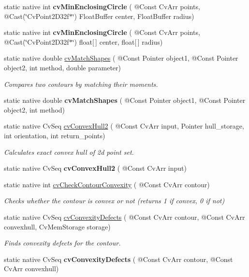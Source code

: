 \begin{DoxyCompactItemize}
static native int {\bfseries cv\+Min\+Enclosing\+Circle} ( @Const Cv\+Arr points, @Cast(\char`\"{}Cv\+Point2\+D32f$\ast$\char`\"{}) Float\+Buffer center, Float\+Buffer radius)
\item 
static native int {\bfseries cv\+Min\+Enclosing\+Circle} ( @Const Cv\+Arr points, @Cast(\char`\"{}Cv\+Point2\+D32f$\ast$\char`\"{}) float\mbox{[}$\,$\mbox{]} center, float\mbox{[}$\,$\mbox{]} radius)
\item 
static native double \hyperlink{group__imgproc__c_gab9210add45c3838c6939630bb55fa97f}{cv\+Match\+Shapes} ( @Const Pointer object1, @Const Pointer object2, int method, double parameter)
\begin{DoxyCompactList}\small\item\em Compares two contours by matching their moments. \end{DoxyCompactList}\item 
static native double {\bfseries cv\+Match\+Shapes} ( @Const Pointer object1, @Const Pointer object2, int method)
\item 
static native Cv\+Seq \hyperlink{group__imgproc__c_ga97e54b0658572d02cdef5ae91799499d}{cv\+Convex\+Hull2} ( @Const Cv\+Arr input, Pointer hull\+\_\+storage, int orientation, int return\+\_\+points)
\begin{DoxyCompactList}\small\item\em Calculates exact convex hull of 2d point set. \end{DoxyCompactList}\item 
static native Cv\+Seq {\bfseries cv\+Convex\+Hull2} ( @Const Cv\+Arr input)
\item 
static native int \hyperlink{group__imgproc__c_ga178a23955341ae86d5a45b1e1c71f7f7}{cv\+Check\+Contour\+Convexity} ( @Const Cv\+Arr contour)
\begin{DoxyCompactList}\small\item\em Checks whether the contour is convex or not (returns 1 if convex, 0 if not) \end{DoxyCompactList}\item 
static native Cv\+Seq \hyperlink{group__imgproc__c_ga186461d20f3b430d538560470ed76ea1}{cv\+Convexity\+Defects} ( @Const Cv\+Arr contour, @Const Cv\+Arr convexhull, Cv\+Mem\+Storage storage)
\begin{DoxyCompactList}\small\item\em Finds convexity defects for the contour. \end{DoxyCompactList}\item 
static native Cv\+Seq {\bfseries cv\+Convexity\+Defects} ( @Const Cv\+Arr contour, @Const Cv\+Arr convexhull)

\end{DoxyCompactItemize}
